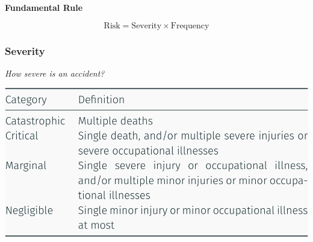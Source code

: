 \documentclass[
  10pt,
  a4paper,
]{article}
\begin{document}
\begin{multicols*}{2}
\begin{tcolorbox}[enhanced jigsaw, rightrule=.15mm, colback=white, colframe=quarto-callout-important-color-frame, breakable, leftrule=.75mm, bottomrule=.15mm, toprule=.15mm, arc=.35mm, opacityback=0, left=2mm]
\begin{minipage}[t]{5.5mm}
\textcolor{quarto-callout-important-color}{\faExclamation}
\end{minipage}%
\begin{minipage}[t]{\textwidth - 5.5mm}

\vspace{-3mm}\textbf{Fundamental Rule}\vspace{3mm}

\[
\text{Risk} = \text{Severity} \times \text{Frequency} 
\]

\end{minipage}%
\end{tcolorbox}

\resizebox{\columnwidth}{!}{
  
}

\begin{minipage}[c][1cm][c]{.7\columnwidth}

\subsubsection{Severity}\label{severity}

\vspace{-2mm}{\color{Orchid}\faQuestionCircle[regular]} \emph{How severe
is an accident?}

\end{minipage}%
\begin{minipage}[c][1cm][c]{.3\columnwidth}
\makebox[30mm][r]{
\resizebox{!}{0.9cm}{
  
}}
\end{minipage}

\includegraphics{images/safety/image-3.png}


\end{multicols*}
\end{document}
